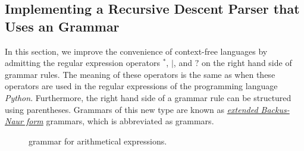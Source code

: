 
\subsection{Implementing a Recursive Descent Parser that Uses an \texorpdfstring{}{EBNF} Grammar
            \label{section:recursive-descent-ebnf}}
In this section, we improve the convenience of context-free
languages by admitting the regular expression operators ${}^*$, $\mid$, and $?$ on
the right hand side of grammar rules.  The meaning of these operators is the same as when these operators are used in 
the regular expressions of the programming language \textsl{Python}.  Furthermore, the right hand side of a
grammar rule can be structured using parentheses.  Grammars of this new type are known as
\href{http://en.wikipedia.org/wiki/Extended_Backus_Naur_Form}{\emph{extended Backus-Naur form}}
 grammars, which is abbreviated as  grammars.


\begin{figure}[htbp]
  \begin{center}    
  \end{center}
  \caption{ grammar for arithmetical expressions.}
  \label{fig:arith-expr-ebnf}
\end{figure}

